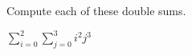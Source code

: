 
%
%
%

	Compute each of these double sums.
	\begin{subproblem}
		\skipitem
		\skipitem
		\skipitem
		\item $\sum\limits_{i=0}^2 \sum\limits_{j=0}^3 i^2j^3$
	\end{subproblem}

\solution
	\begin{subproblem}
		\skipitem
		\skipitem
		\skipitem
		\item 
	\end{subproblem}
